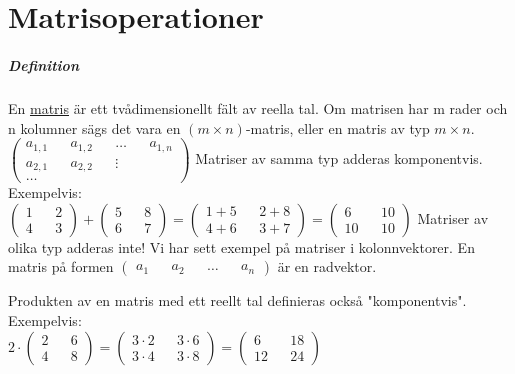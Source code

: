 \chapter{Matrisoperationer}
\paragraph{Definition} En \underline{matris} är ett tvådimensionellt fält av reella tal.
Om matrisen har m rader och n kolumner sägs det vara en $(m\times n)$-matris, eller en matris av typ $m\times n$.
$\begin{pmatrix}
    a_{1,1} && a_{1,2} && \ldots && a_{1,n}\\
    a_{2,1} && a_{2,2} && \vdots && \\
    \ldots
\end{pmatrix}$
Matriser av samma typ adderas komponentvis. Exempelvis:\\
$\begin{pmatrix}
    1&&2\\4&&3
\end{pmatrix}+\begin{pmatrix}
    5&&8\\6&&7
\end{pmatrix}=
\begin{pmatrix}
    1+5&&2+8\\4+6&&3+7
\end{pmatrix}=\begin{pmatrix}
    6&&10\\10&&10
\end{pmatrix}$
Matriser av olika typ adderas inte!
Vi har sett exempel på matriser i kolonnvektorer.
En matris på formen $\begin{pmatrix}a_{1}&&a_{2}&&\hdots&&a_{n}\end{pmatrix}$ är en radvektor.

Produkten av en matris med ett reellt tal definieras också "komponentvis". Exempelvis:\\
$2\cdot \begin{pmatrix}
    2&&6\\4&&8
\end{pmatrix}=\begin{pmatrix}
    3\cdot 2&&3\cdot 6\\3\cdot 4&&3\cdot 8
\end{pmatrix}=\begin{pmatrix}
    6&&18\\12&&24
\end{pmatrix}$

